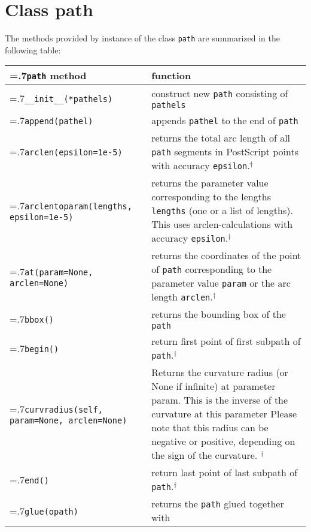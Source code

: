 \section{Class path}

The methods provided by instance of the class \verb|path| are
summarized in the following table:

\medskip
\begin{tabularx}{1.04\linewidth}{>{\hsize=.7\hsize}X>{\raggedright\arraybackslash\hsize=1.3\hsize}X}
  \texttt{path} method & function \\
  \hline \texttt{\_\_init\_\_(*pathels)} & construct new \texttt{path}
  consisting of \texttt{pathels}\\
  \texttt{append(pathel)} & appends \texttt{pathel} to the end of 
  \texttt{path}\\
  \texttt{arclen(epsilon=1e-5)} & returns the total arc length of
  all \texttt{path} segments in PostScript points with accuracy
  \texttt{epsilon}.$^\dagger$\\
  \texttt{arclentoparam(lengths, \newline\phantom{arclentoparam(}epsilon=1e-5)} & returns the
  parameter value corresponding to the lengths \texttt{lengths} (one or a list of
  lengths). This uses arclen-calculations with accuracy
  \texttt{epsilon}.$^\dagger$\\
  \texttt{at(param=None,
    \newline\phantom{at(}arclen=None)} & returns the coordinates of the point of
  \texttt{path} corresponding to the parameter value
  \texttt{param} or the arc length \verb|arclen|.$^\dagger$\\
  \texttt{bbox()} & returns the bounding box of the \texttt{path}\\
  \texttt{begin()} & return first point of first subpath of
  \texttt{path}.$^\dagger$\\
   \texttt{curvradius(self, 
    \newline\phantom{curvradius(}param=None,
    \newline\phantom{curvradius(}arclen=None)} &
        Returns the curvature radius (or None if infinite) at parameter param.
        This is the inverse of the curvature at this parameter
        Please note that this radius can be negative or positive,
        depending on the sign of the curvature.
        $^\dagger$
        \\
  \texttt{end()} & return last point of last subpath of
  \texttt{path}.$^\dagger$\\
  \texttt{glue(opath)} & returns the \texttt{path} glued together with

\end{tabularx}
